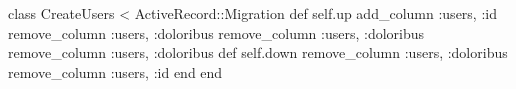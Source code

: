 class CreateUsers < ActiveRecord::Migration
    def self.up
		add_column :users, :id
		remove_column :users, :doloribus
		remove_column :users, :doloribus
		remove_column :users, :doloribus
	def self.down
		remove_column :users, :doloribus
		remove_column :users, :id
  end
end 
